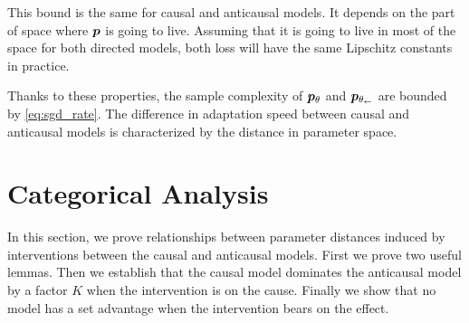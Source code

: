 \begin{subappendices}
This bound is the same for causal and anticausal models. It depends on the part of space where ${\bm{p}}$ is going to live. Assuming that it is going to live in most of the space for both directed models, both loss will have the same Lipschitz constants in practice.

Thanks to these properties, the sample complexity of $\bm{p}_{\theta}$ and $\bm{p}_{\theta_\leftarrow}$ are bounded by \eqref{eq:sgd_rate}. 
The difference in adaptation speed between causal and anticausal models is characterized by the distance in parameter space. 




\section{{Categorical Analysis}}
\label{apdx:categorical_analysis}

In this section, we prove relationships between parameter distances induced by interventions between the causal and anticausal models. 
First we prove two useful lemmas. 
Then we establish that the causal model dominates the anticausal model by a factor $K$ when the intervention is on the cause. 
Finally we show that no model has a set advantage when the intervention bears on the effect.



\end{subappendices}
